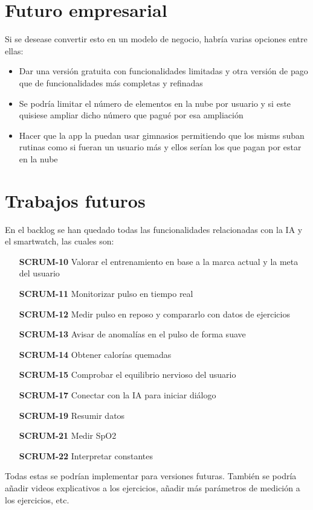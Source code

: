 \section{Futuro empresarial}

Si se desease convertir esto en un modelo de negocio, habría varias opciones entre ellas:

\begin{itemize}
	\item Dar una versión gratuita con funcionalidades limitadas y otra versión de pago que de funcionalidades más completas y refinadas
	\item Se podría limitar el número de elementos en la nube por usuario y si este quisiese ampliar dicho número que pagué por esa ampliación 
	\item Hacer que la app la puedan usar gimnasios permitiendo que los misms suban rutinas como si fueran un usuario más y ellos serían los que pagan por estar en la nube
\end{itemize}

\section{Trabajos futuros}

En el backlog se han quedado todas las funcionalidades relacionadas con la IA y el smartwatch, las cuales son:

\begin{itemize}
	\item[\textbf{SCRUM-10}] Valorar el entrenamiento en base a la marca actual y la meta del usuario
  	\item[\textbf{SCRUM-11}] Monitorizar pulso en tiempo real
	\item[\textbf{SCRUM-12}] Medir pulso en reposo y compararlo con datos de ejercicios
	\item[\textbf{SCRUM-13}] Avisar de anomalías en el pulso de forma suave
	\item[\textbf{SCRUM-14}] Obtener calorías quemadas
	\item[\textbf{SCRUM-15}] Comprobar el equilibrio nervioso del usuario
	\item[\textbf{SCRUM-17}] Conectar con la IA para iniciar diálogo
	\item[\textbf{SCRUM-19}] Resumir datos
	\item[\textbf{SCRUM-21}] Medir SpO2
	\item[\textbf{SCRUM-22}] Interpretar constantes
\end{itemize}

Todas estas se podrían implementar para versiones futuras. También se podría añadir videos explicativos a los ejercicios, añadir más parámetros de medición a los ejercicios, etc.